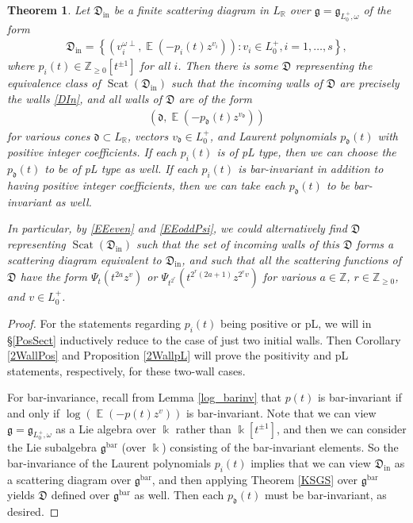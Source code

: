 \documentclass{amsart}
\DeclareMathOperator{\In}{in}
\DeclareMathOperator{\EE}{\mathbb{E}}
\DeclareMathOperator{\scat}{Scat}
\DeclareMathOperator{\barr}{bar}
\let\bb=\mathbb
\let\f=\mathfrak
\newcommand {\kk} {\Bbbk}
\theoremstyle{plain}%
\newtheorem{thm}{Theorem}[section]
\theoremstyle{definition}
\theoremstyle{remark}
\begin{document}
\begin{thm}\label{PosScat}
Let $\f{D}_{\In}$ be a finite scattering diagram in $L_{\bb{R}}$ over $\f{g}=\f{g}_{L_0^+,\omega}$ of the form
\begin{align}\label{DIn}
\f{D}_{\In}=\left\{(v_i^{\omega\perp},\EE(-p_i(t)z^{v_i}))\colon v_i\in L_0^+,i=1,\ldots,s\right\},
\end{align}
where $p_i(t)\in\mathbb{Z}_{\geq 0}[t^{\pm 1}]$ for all $i$.
Then there is some $\f{D}$ representing the equivalence class of $\scat(\f{D}_{\In})$ such that the incoming walls of $\f{D}$ are precisely the walls \eqref{DIn}, and all walls of $\f{D}$ are of the form 
\begin{align}\label{Dwalls}
    (\f{d},\EE(-p_{\f{d}}(t)z^{v_{\f{d}}}))
\end{align}
for various cones $\f{d}\subset L_{\bb{R}}$, vectors $v_{\f{d}}\in L_0^+$, and Laurent polynomials $p_{\f{d}}(t)$ with positive integer coefficients. If each $p_i(t)$ is of pL type, then we can choose the $p_{\f{d}}(t)$ to be of pL type as well.  If each $p_i(t)$ is bar-invariant in addition to having positive integer coefficients, then we can take each $p_{\f{d}}(t)$ to be bar-invariant as well. 

In particular, by \eqref{EEeven} and \eqref{EEoddPsi}, we could alternatively find $\f{D}$ representing $\scat(\f{D}_{\In})$ such that the set of incoming walls of this $\f{D}$ forms a scattering diagram equivalent to $\f{D}_{\In}$, and such that all the scattering functions of $\f{D}$ have the form $\Psi_t(t^{2a}z^v)$ or $\Psi_{t^{2^r}}(t^{2^r(2a+1)}z^{2^rv})$ for various $a\in \bb{Z}$, $r\in \bb{Z}_{\geq 0}$, and $v\in L_0^+$.
\end{thm}
\begin{proof}
For the statements regarding $p_i(t)$ being positive or pL, we will in \S \ref{PosSect} inductively reduce to the case of just two initial walls.  Then Corollary \ref{2WallPos} and Proposition \ref{2WallpL} will prove the positivity and pL statements, respectively, for these two-wall cases.

For bar-invariance, recall from Lemma \ref{log_barinv} that $p(t)$ is bar-invariant if and only if $\log(\EE(-p(t)z^v))$ is bar-invariant.
Note that we can view $\f{g}=\f{g}_{L_0^+,\omega}$ as a Lie algebra over $\kk$ rather than $\kk[t^{\pm 1}]$, and then we can consider the Lie subalgebra $\f{g}^{\barr}$ (over $\kk$) consisting of the bar-invariant elements.  So the bar-invariance of the Laurent polynomials $p_i(t)$ implies that we can view $\f{D}_{\In}$ as a scattering diagram over $\f{g}^{\barr}$, and then applying Theorem \ref{KSGS}  over $\f{g}^{\barr}$ yields $\f{D}$ defined over $\f{g}^{\barr}$ as well.  Then each $p_{\f{d}}(t)$ must be bar-invariant, as desired.
\end{proof}
\end{document}

